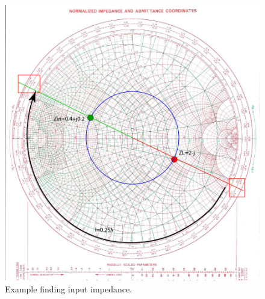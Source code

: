 \documentclass{ximera}
\begin{document}
\begin{example}
\begin{explanation}
\begin{figure}[htbp]
\begin{center}
\includegraphics[scale=0.6]{../jpg/InputImpedanceEx1-01.jpg}
\end{center}
\caption{Example finding input impedance.}
\label{fig:SCImpRefExample1}
\end{figure}

\end{explanation}
\end{example}
\end{document}
